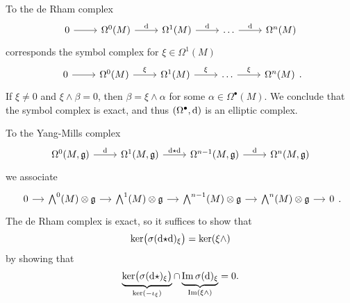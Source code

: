 \begin{example}
  To the de Rham complex
  \begin{equation*}
    \begin{tikzcd}
      0 \arrow[r] &
      \Omega^0 (M) \arrow[r, "\drm"] &
      \Omega^1 (M) \arrow[r, "\drm"] &
      \dots \arrow[r, "\drm"] &
      \Omega^n (M)
    \end{tikzcd}
  \end{equation*}
  corresponds the symbol complex for $\xi \in \Omega^1 (M)$
  \begin{equation*}
    \begin{tikzcd}
      0 \arrow[r] &
      \Omega^0 (M) \arrow[r, "\xi"] &
      \Omega^1 (M) \arrow[r, "\xi"] &
      \dots \arrow[r, "\xi"] &
      \Omega^n (M)
    \end{tikzcd}.
  \end{equation*}
  If $\xi \neq 0$ and $\xi \wedge \beta = 0$, then $\beta = \xi \wedge \alpha$ for some $\alpha \in \Omega^\bullet(M)$. We conclude that the symbol complex is exact, and thus $(\Omega^\bullet, \mathrm{d})$ is an elliptic complex.
\end{example}

\begin{example}
  To the Yang-Mills complex
  \begin{equation*}
    \begin{tikzcd}
      \Omega^0(M, \gfrak) \arrow[r, "\drm"] &
      \Omega^1(M, \gfrak) \arrow[r, "\drm \hodge \drm"] &
      \Omega^{n-1} (M, \gfrak) \arrow[r, "\drm"] &
      \Omega^n(M, \gfrak)
    \end{tikzcd}
  \end{equation*}
  we associate
  \begin{equation*}
    \begin{tikzcd}[sep=small]
      0 \arrow[r] &
      \bigwedge^0 (M) \otimes \gfrak \arrow[r] &
      \bigwedge^1 (M) \otimes \gfrak \arrow[r] &
      \bigwedge^{n-1} (M) \otimes \gfrak \arrow[r] &
      \bigwedge^n (M) \otimes \gfrak \arrow[r] & 0
    \end{tikzcd}.
  \end{equation*}
  The de Rham complex is exact, so it suffices to show that
  \begin{equation*}
    \ker \bigl( \sigma(\mathrm{d} {\star} \mathrm{d})_\xi \bigr)
    = \ker (\xi \wedge)
  \end{equation*}
  by showing that
  \begin{equation*}
    \underbrace{\ker \bigl( \sigma(\mathrm{d} {\star})_\xi \bigr)}_{\ker(- \iota_\xi)}
    \cap \underbrace{\operatorname{Im} \sigma(\mathrm{d})_\xi}_{\operatorname{Im}(\xi \wedge)} = 0.
  \end{equation*}
\end{example}

